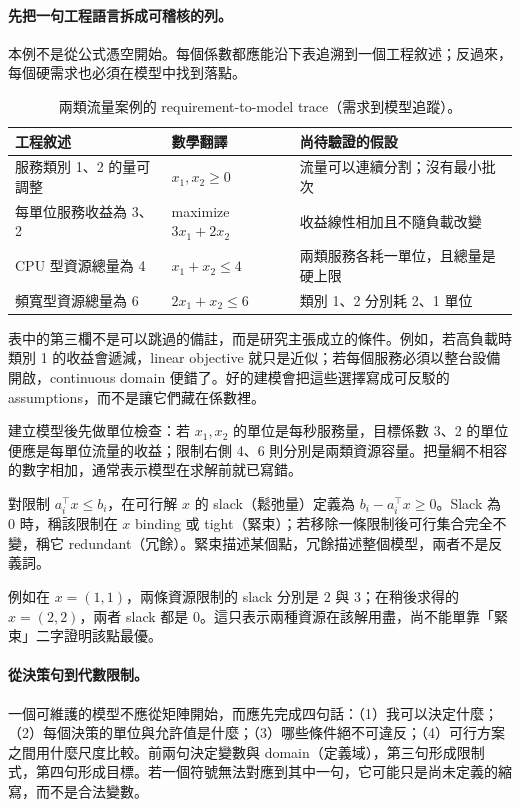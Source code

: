 \documentclass[11pt,a4paper,oneside,openany]{book}
\begin{document}
\paragraph{先把一句工程語言拆成可稽核的列。}
本例不是從公式憑空開始。每個係數都應能沿下表追溯到一個工程敘述；反過來，每個硬需求也必須在模型中找到落點。
\begin{table}[htbp]
\centering
\caption{兩類流量案例的 requirement-to-model trace（需求到模型追蹤）。}
\label{tab:req-model-trace}
\begin{tabularx}{.96\textwidth}{@{}p{}p{}Y@{}}
\toprule
工程敘述 & 數學翻譯 & 尚待驗證的假設 \\
\midrule
服務類別 1、2 的量可調整
  & $x_1,x_2\ge0$
  & 流量可以連續分割；沒有最小批次 \\
每單位服務收益為 3、2
  & maximize $3x_1+2x_2$
  & 收益線性相加且不隨負載改變 \\
CPU 型資源總量為 4
  & $x_1+x_2\le4$
  & 兩類服務各耗一單位，且總量是硬上限 \\
頻寬型資源總量為 6
  & $2x_1+x_2\le6$
  & 類別 1、2 分別耗 2、1 單位 \\
\bottomrule
\end{tabularx}
\end{table}

表中的第三欄不是可以跳過的備註，而是研究主張成立的條件。例如，若高負載時類別 1 的收益會遞減，linear objective 就只是近似；若每個服務必須以整台設備開啟，continuous domain 便錯了。好的建模會把這些選擇寫成可反駁的 assumptions，而不是讓它們藏在係數裡。

建立模型後先做單位檢查：若 $x_1,x_2$ 的單位是每秒服務量，目標係數 3、2 的單位便應是每單位流量的收益；限制右側 4、6 則分別是兩類資源容量。把量綱不相容的數字相加，通常表示模型在求解前就已寫錯。

\begin{definition}
對限制 $a_i^\top x\le b_i$，在可行解 $x$ 的 slack（鬆弛量）定義為 $b_i-a_i^\top x\ge0$。Slack 為 0 時，稱該限制在 $x$ binding 或 tight（緊束）；若移除一條限制後可行集合完全不變，稱它 redundant（冗餘）。緊束描述某個點，冗餘描述整個模型，兩者不是反義詞。
\end{definition}

例如在 $x=(1,1)$，兩條資源限制的 slack 分別是 $2$ 與 $3$；在稍後求得的 $x=(2,2)$，兩者 slack 都是 0。這只表示兩種資源在該解用盡，尚不能單靠「緊束」二字證明該點最優。

\paragraph{從決策句到代數限制。}
一個可維護的模型不應從矩陣開始，而應先完成四句話：（1）我可以決定什麼；（2）每個決策的單位與允許值是什麼；（3）哪些條件絕不可違反；（4）可行方案之間用什麼尺度比較。前兩句決定變數與 domain（定義域），第三句形成限制式，第四句形成目標。若一個符號無法對應到其中一句，它可能只是尚未定義的縮寫，而不是合法變數。
\end{document}
